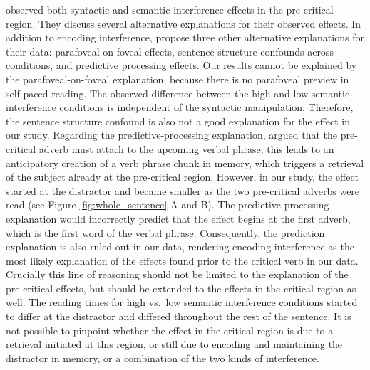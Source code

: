\documentclass[a4paper, man, floatsintext]{apa7}
\begin{document}
\textcite{mertzen} observed both syntactic and semantic interference effects in the pre-critical region. 
They discuss several alternative explanations for their observed effects. In addition to encoding interference, \textcite{mertzen} propose three other alternative explanations for their data: parafoveal-on-foveal effects, sentence structure confounds across conditions, and predictive processing effects. Our results cannot be explained by the parafoveal-on-foveal explanation, because there is no parafoveal preview in self-paced reading. The observed difference between the high and low semantic interference conditions is independent of the syntactic manipulation. Therefore, the sentence structure confound is also not a good explanation for the effect in our study. Regarding the predictive-processing explanation, \citet{mertzen} argued that the pre-critical adverb must attach to the upcoming verbal phrase; this leads to an anticipatory creation of a verb phrase chunk in memory, which triggers a retrieval of the subject already at the pre-critical region. However, in our study, the effect started at the distractor and became smaller as the two pre-critical adverbs were read (see Figure \ref{fig:whole_sentence} A and B). The predictive-processing explanation would incorrectly predict that the effect begins at the first adverb, which is the first word of the verbal phrase. Consequently, the prediction explanation is also ruled out in our data, rendering encoding interference as the most likely explanation of the effects found prior to the critical verb in our data. Crucially this line of reasoning should not be limited to the explanation of the pre-critical effects, but should be extended to the effects in the critical region as well. The reading times for high vs.\ low semantic interference conditions started to differ at the distractor and differed throughout the rest of the sentence. It is not possible to pinpoint whether the effect in the critical region is due to a retrieval initiated at this region, or still due to encoding and maintaining the distractor in memory, or a combination of the two kinds of interference.
\end{document}
